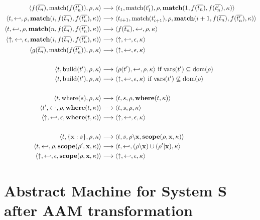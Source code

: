 \documentclass{article}
\begin{document}
{\begin{align*}
  \transition{f(\overline{t_n}),\match{f(\overline{t_n'})},\rho,\kappa}
             {t_1,\match{t_1'},\rho,\cont{match}{1,f(\overline{t_n}),f(\overline{t_n'}),\kappa}} \\
  \transition{t,\return,\rho,\cont{match}{i,f(\overline{t_n}),f(\overline{t_n'}),\kappa}}
             {t_{i+1},\match{t_{i+1}'},\rho,\cont{match}{i+1,f(\overline{t_n}),f(\overline{t_n'}),\kappa}} \\
  \transition{t,\return,\rho,\cont{match}{n,f(\overline{t_n}),f(\overline{t_n'}),\kappa}}
             {f(\overline{t_n}),\return,\rho,\kappa} \\
  \transition{\fail,\return,\epsilon,\cont{match}{i,f(\overline{t_n}),f(\overline{t_n'}),\kappa}}
             {\fail,\return,\epsilon,\kappa} \\
  \transition{g(\overline{t_n}),\match{f(\overline{t_n'})},\rho,\kappa}
             {\fail,\return,\epsilon,\kappa} \\
  \notag \\
  \transition{t,\build{t'},\rho,\kappa}
             {\rho(t'),\return,\rho,\kappa} \text{ if } \text{vars}(t') \subseteq \text{dom}(\rho) \\
  \transition{t,\build{t'},\rho,\kappa}
             {\fail,\return,\epsilon,\kappa} \text{ if } \text{vars}(t') \not\subseteq \text{dom}(\rho) \\
  \notag \\
  \transition{t,\where{s},\rho,\kappa}{t,s,\rho,\cont{where}{t,\kappa}} \\
  \transition{t',\return,\rho,\cont{where}{t,\kappa}}{t,s,\rho,\kappa} \\
  \transition{\fail,\return,\epsilon,\cont{where}{t,\kappa}}{\fail,\return,\epsilon,\kappa} \\
  \notag \\
  \transition{t,\scope{\vars{x}}{s},\rho,\kappa}
             {t,s,\rho \backslash \vars{x},\cont{scope}{\rho,\vars{x},\kappa}} \\
  \transition{t,\return,\rho,\cont{scope}{\rho',\vars{x},\kappa}}
             {t,\return,(\rho \backslash \vars{x}) \cup (\rho' | \vars{x}),\kappa} \\
  \transition{\fail,\return,\epsilon,\cont{scope}{\rho,\vars{x},\kappa}}
             {\fail,\return,\epsilon,\kappa} \\
\end{align*}

\clearpage

\section*{Abstract Machine for System S after AAM transformation}

}
\end{document}
